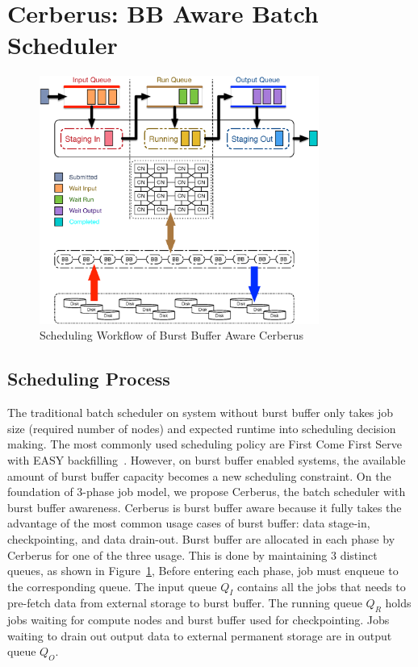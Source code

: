 \section{Cerberus: BB Aware Batch Scheduler}
\label{Sec:Scheduler}

\begin{figure}[!htbp]
        \centering
        \includegraphics[width=3.6in]{CerberusBBSystem}
        \caption{Scheduling Workflow of Burst Buffer Aware Cerberus}
        \label{Fig:CerberusQueues}
\end{figure}

\subsection{Scheduling Process}

The traditional batch scheduler on system without burst buffer only
takes job size (required number of nodes) and expected runtime into scheduling decision making. 
The most commonly used scheduling policy are First Come First Serve with
EASY backfilling~\cite{tsafrir-tpds-2007}.
However, on burst buffer enabled systems, 
the available amount of burst buffer capacity becomes a new scheduling constraint.
On the foundation of 3-phase job model,
we propose Cerberus, the batch scheduler with burst buffer awareness.
Cerberus is burst buffer aware because it fully takes the advantage of the 
most common usage cases of burst buffer: data stage-in, checkpointing, and data drain-out.
Burst buffer are allocated in each phase by Cerberus for one of the three usage.
This is done by maintaining 3 distinct queues, as shown in Figure~\ref{Fig:CerberusQueues},
Before entering each phase, job must enqueue to the corresponding queue.
The input queue $Q_I$ contains all the jobs that
needs to pre-fetch data from external storage to burst buffer.
The running queue $Q_R$ holds jobs
waiting for compute nodes and burst buffer used for checkpointing.
Jobs waiting to drain out output data to external permanent storage are in output queue $Q_O$.

